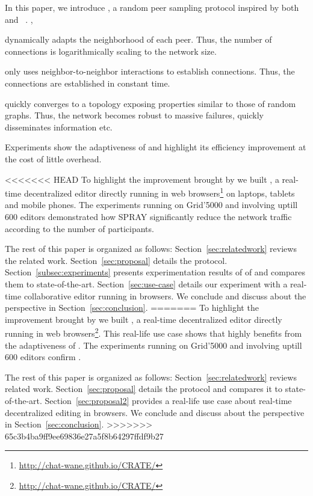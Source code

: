 In this paper, we introduce \SPRAY, a random peer sampling protocol inspired by
both \SCAMP~\cite{ganesh2003peer}
and \CYCLON~\cite{voulgaris2005cyclon}. ,
\begin{inparaenum}[(i)]
\item \SPRAY dynamically adapts the neighborhood of each peer. Thus, the number
  of connections is logarithmically scaling to the network size.
\item \SPRAY only uses neighbor-to-neighbor interactions to establish
  connections. Thus, the connections are established in constant time.
\item \SPRAY quickly converges to a topology exposing properties similar to
  those of random graphs. Thus, the network becomes robust to massive failures,
  quickly disseminates information etc.
\item Experiments show the adaptiveness of \SPRAY and highlight its efficiency
  improvement at the cost of little overhead.
\end{inparaenum}

<<<<<<< HEAD
To highlight the improvement brought by \SPRAY we built \CRATE, a
real-time decentralized editor directly running in web
browsers\footnote{\url{http://chat-wane.github.io/CRATE/}} on laptops,
tablets and mobile phones. The experiments running on Grid'5000 and
involving uptill 600 editors demonstrated how SPRAY significantly
reduce the network traffic according to the number of
participants. 

The rest of this paper is organized as follows:
Section~\ref{sec:relatedwork} reviews the related
work. Section~\ref{sec:proposal} details the \SPRAY
protocol. Section~\ref{subsec:experiments} presents experimentation
results of of \SPRAY and compares them to
state-of-the-art. Section~\ref{sec:use-case} details our experiment
with \CRATE a real-time collaborative editor running in browsers. We
conclude and discuss about the perspective in
Section~\ref{sec:conclusion}.
=======
To highlight the improvement brought by \SPRAY we built \CRATE, a real-time
decentralized editor directly running in web
browsers\footnote{\url{http://chat-wane.github.io/CRATE/}}. This real-life use
case shows that  highly benefits from the
adaptiveness of \SPRAY. The experiments running on Grid'5000 and involving
uptill 600 editors confirm .

The rest of this paper is organized as follows: Section~\ref{sec:relatedwork}
reviews related work. Section~\ref{sec:proposal} details the \SPRAY protocol and
compares it to state-of-the-art. Section~\ref{sec:proposal2} provides a
real-life use case about real-time decentralized editing in browsers. We
conclude and discuss about the perspective in Section~\ref{sec:conclusion}.
>>>>>>> 65c3b4ba9ff9ee69836e27a5f8b64297ffdf9b27

